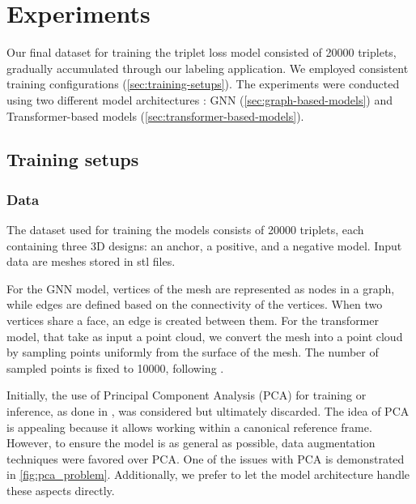 \chapter{Experiments}
\label{sec:experiments}

Our final dataset for training the triplet loss model consisted of 20000 triplets, gradually accumulated through our labeling application. We employed consistent training configurations (\autoref{sec:training-setups}). The experiments were conducted using two different model architectures : GNN (\autoref{sec:graph-based-models}) and Transformer-based models (\autoref{sec:transformer-based-models}). 

\section{Training setups}
\label{sec:training-setups}

\subsection{Data}

The dataset used for training the models consists of 20000 triplets, each containing three 3D designs: an anchor, a positive, and a negative model. Input data are meshes stored in stl files.

For the GNN model, vertices of the mesh are represented as nodes in a graph, while edges are defined based on the connectivity of the vertices. When two vertices share a face, an edge is created between them. 
For the transformer model, that take as input a point cloud, we convert the mesh into a point cloud by sampling points uniformly from the surface of the mesh. The number of sampled points is fixed to 10000, following \cite{liuOpenShapeScaling3D2023}.

Initially, the use of Principal Component Analysis (PCA) for training or inference, as done in \cite{popRotationInvariantGraph2023}, was considered but ultimately discarded. The idea of PCA is appealing because it allows working within a canonical reference frame. However, to ensure the model is as general as possible, data augmentation techniques were favored over PCA. One of the issues with PCA is demonstrated in \autoref{fig:pca_problem}. Additionally, we prefer to let the model architecture handle these aspects directly.

